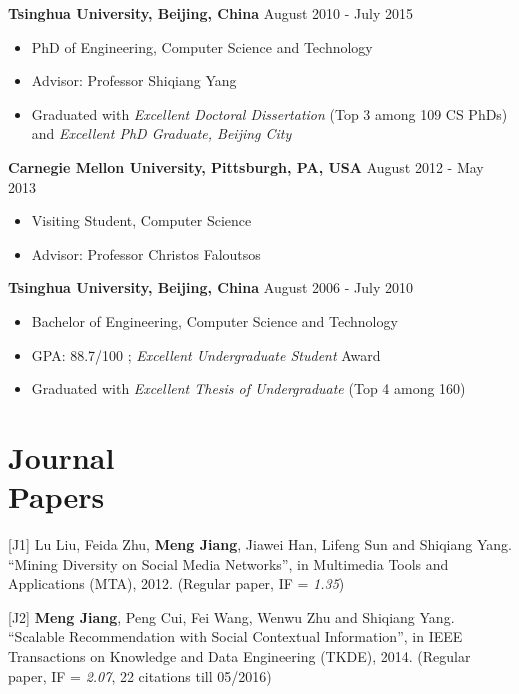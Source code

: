\documentclass[margin, 10pt]{res} %
\begin{document}
\begin{resume}
{\bf Tsinghua University, Beijing, China} \hfill {August 2010 - July 2015}
\begin{itemize} \itemsep -2pt %
\item PhD of Engineering, Computer Science and Technology
\item Advisor: Professor Shiqiang Yang
\item Graduated with {\em Excellent Doctoral Dissertation} (Top 3 among 109 CS PhDs)
	and {\em Excellent PhD Graduate, Beijing City}
\end{itemize}

{\bf Carnegie Mellon University, Pittsburgh, PA, USA} \hfill {August 2012 - May 2013}
\begin{itemize} \itemsep -2pt %
\item Visiting Student, Computer Science
\item Advisor: Professor Christos Faloutsos
\end{itemize}

{\bf Tsinghua University, Beijing, China} \hfill {August 2006 - July 2010}
\begin{itemize} \itemsep -2pt %
\item Bachelor of Engineering, Computer Science and Technology
\item GPA: 88.7/100 %
	; {\em Excellent Undergraduate Student} Award
\item Graduated with {\em Excellent Thesis of Undergraduate} (Top 4 among 160)
\end{itemize}


\section{Journal \\ Papers}

[J1] Lu Liu, Feida Zhu, {\bf Meng Jiang}, Jiawei Han, Lifeng Sun and Shiqiang Yang. ``Mining Diversity on Social Media Networks'', in Multimedia Tools and Applications (MTA), 2012. (Regular paper, IF = {\em 1.35})

[J2] {\bf Meng Jiang}, Peng Cui, Fei Wang, Wenwu Zhu and Shiqiang Yang. ``Scalable Recommendation with Social Contextual Information'', in IEEE Transactions on Knowledge and Data Engineering (TKDE), 2014. (Regular paper, IF = {\em 2.07}, 22 citations till 05/2016)


\end{resume}
\end{document}
